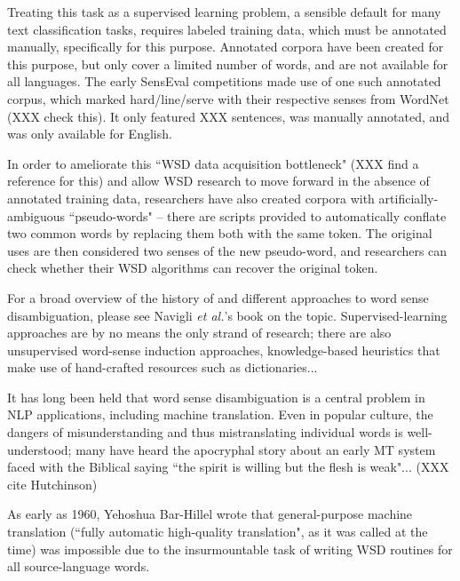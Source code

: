 

Treating this task as a supervised learning problem, a sensible default for
many text classification tasks, requires labeled training data, which must be
annotated manually, specifically for this purpose. Annotated corpora have been
created for this purpose, but only cover a limited number of words, and are not
available for all languages. The early SensEval competitions made use of one
such annotated corpus, which marked hard/line/serve with their respective
senses from WordNet (XXX check this). It only featured XXX sentences, was
manually annotated, and was only available for English.

In order to ameliorate this
``WSD data acquisition bottleneck" (XXX find a reference for this) and allow
WSD research to move forward in the absence of annotated training data,
researchers have also created corpora with artificially-ambiguous
``pseudo-words" -- there are scripts provided to automatically conflate two
common words by replacing them both with the same token. The original uses are
then considered two senses of the new pseudo-word, and researchers can check
whether their WSD algorithms can recover the original token.

For a broad overview of the history of and  different approaches to word sense
disambiguation, please see
Navigli \emph{et al.}'s book on the topic. \cite{agirre2006word}
Supervised-learning approaches are by no means the only strand of research;
there are also unsupervised word-sense induction approaches,
knowledge-based heuristics that make use of hand-crafted resources such as
dictionaries...

It has long been held that word sense disambiguation is a central problem in
NLP applications, including machine translation.
Even in popular culture, the dangers of misunderstanding and thus
mistranslating individual words is well-understood; many have heard the
apocryphal story about an early MT system faced with the Biblical saying ``the
spirit is willing but the flesh is weak"... (XXX cite Hutchinson)

As early as 1960, Yehoshua Bar-Hillel wrote that general-purpose machine
translation (``fully automatic high-quality  translation", as it was  called at
the  time) was impossible due to the insurmountable task of writing WSD
routines for all source-language words. \cite{barhillel1960}

